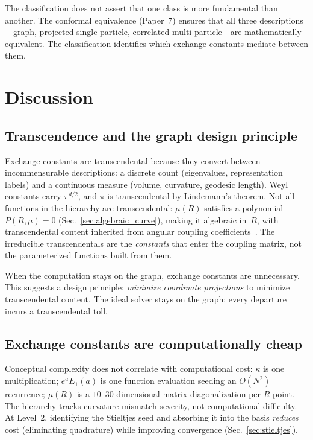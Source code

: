 \documentclass[aps,pra,twocolumn,superscriptaddress,longbibliography]{revtex4-2}
\begin{document}
The classification does not assert that one class is more
fundamental than another.  The conformal equivalence
(Paper~7) ensures that all three descriptions---graph, projected
single-particle, correlated multi-particle---are mathematically
equivalent.  The classification identifies which exchange
constants mediate between them.



\section{Discussion}
\label{sec:discussion}

\subsection{Transcendence and the graph design principle}

Exchange constants are transcendental because they convert between
incommensurable descriptions: a discrete count (eigenvalues,
representation labels) and a continuous measure (volume, curvature,
geodesic length).  Weyl constants carry $\pi^{d/2}$, and $\pi$ is
transcendental by Lindemann's theorem.  Not all functions in the
hierarchy are transcendental: $\mu(R)$ satisfies a polynomial $P(R,\mu) = 0$
(Sec.~\ref{sec:algebraic_curve}), making it algebraic in~$R$, with
transcendental content inherited from angular coupling
coefficients~\cite{berger2003}.  The irreducible transcendentals are
the \emph{constants} that enter the coupling matrix, not the
parameterized functions built from them.

When the computation stays on the graph, exchange constants are
unnecessary.  This suggests a design principle: \textit{minimize
coordinate projections} to minimize transcendental content.  The
ideal solver stays on the graph; every departure incurs a
transcendental toll.

\subsection{Exchange constants are computationally cheap}

Conceptual complexity does not correlate with computational cost:
$\kappa$ is one multiplication; $e^a E_1(a)$ is one function
evaluation seeding an $O(N^2)$ recurrence; $\mu(R)$ is a
$10$--$30$ dimensional matrix diagonalization per $R$-point.
The hierarchy tracks curvature mismatch severity, not computational
difficulty.  At Level~2, identifying the Stieltjes seed and absorbing
it into the basis \emph{reduces} cost (eliminating quadrature) while
improving convergence (Sec.~\ref{sec:stieltjes}).
\end{document}
